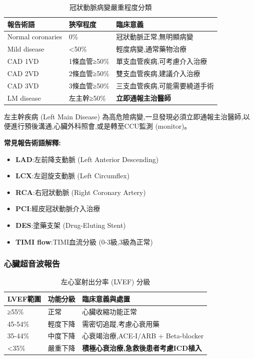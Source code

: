 \documentclass[12pt,a4paper]{article}
\newcommand{\warning}[1]{
    \par
    \noindent
    \begin{tcolorbox}[
        colback=warning_orange!5!white,
        colframe=warning_orange,
        title=\textbf{緊急通報},
        fonttitle=\bfseries,
        boxrule=1pt,
        arc=3pt,
        left=6pt,
        right=6pt,
        top=6pt,
        bottom=6pt
    ]
    #1
    \end{tcolorbox}
}
\begin{document}
\begin{table}[h]
    \centering
    \caption{冠狀動脈病變嚴重程度分類}
    \begin{tabular}{p{4cm} p{3cm} p{7cm}}
        \toprule
        \textbf{報告術語} & \textbf{狹窄程度} & \textbf{臨床意義} \\
        \midrule
        Normal coronaries & 0\% & 冠狀動脈正常,無明顯病變 \\
        Mild disease & <50\% & 輕度病變,通常藥物治療 \\
        CAD 1VD & 1條血管≥50\% & 單支血管疾病,可考慮介入治療 \\
        CAD 2VD & 2條血管≥50\% & 雙支血管疾病,建議介入治療 \\
        CAD 3VD & 3條血管≥50\% & 三支血管疾病,可能需要繞道手術 \\
        LM disease & 左主幹≥50\% & \textcolor{emergency_red}{\textbf{立即通報主治醫師}} \\
        \bottomrule
    \end{tabular}
\end{table}

\warning{
左主幹疾病 (Left Main Disease) 為高危險病變,一旦發現必須立即通報主治醫師,以便進行預後溝通,心臟外科照會,或是轉至CCU監測 (monitor)。
}

\textbf{常見報告術語解釋:}
\begin{itemize}[nosep]
    \item \textbf{LAD}:左前降支動脈 (Left Anterior Descending)
    \item \textbf{LCX}:左迴旋支動脈 (Left Circumflex)
    \item \textbf{RCA}:右冠狀動脈 (Right Coronary Artery)
    \item \textbf{PCI}:經皮冠狀動脈介入治療
    \item \textbf{DES}:塗藥支架 (Drug-Eluting Stent)
    \item \textbf{TIMI flow}:TIMI血流分級 (0-3級,3級為正常)
\end{itemize}

\subsubsection{心臟超音波報告}

\begin{table}[h]
    \centering
    \caption{左心室射出分率 (LVEF) 分級}
    \begin{tabular}{p{3cm} p{3cm} p{8cm}}
        \toprule
        \textbf{LVEF範圍} & \textbf{功能分級} & \textbf{臨床意義與處置} \\
        \midrule
        ≥55\% & 正常 & 心臟收縮功能正常 \\
        45-54\% & 輕度下降 & 需密切追蹤,考慮心衰用藥 \\
        35-44\% & 中度下降 & 心衰竭治療,ACE-I/ARB + Beta-blocker \\
        <35\% & 嚴重下降 & \textcolor{emergency_red}{\textbf{積極心衰治療,急救後患者考慮ICD植入}} \\
        \bottomrule
    \end{tabular}
\end{table}
\end{document}
